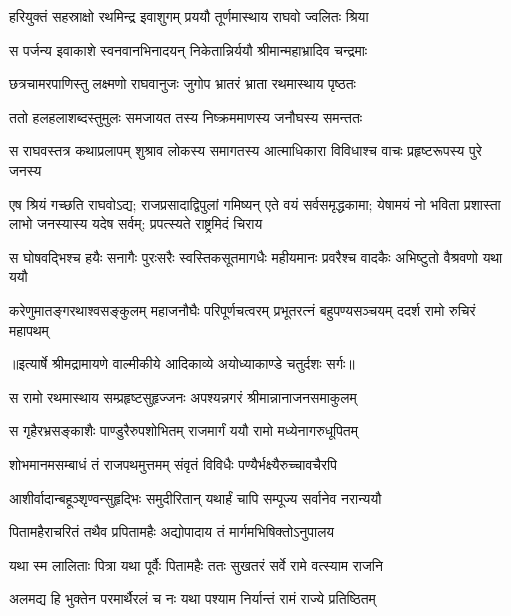 \twolineshloka
{हरियुक्तं सहस्राक्षो रथमिन्द्र इवाशुगम्}
{प्रययौ तूर्णमास्थाय राघवो ज्वलितः श्रिया} %

\twolineshloka
{स पर्जन्य इवाकाशे स्वनवानभिनादयन्}
{निकेतान्निर्ययौ श्रीमान्महाभ्रादिव चन्द्रमाः} %

\twolineshloka
{छत्रचामरपाणिस्तु लक्ष्मणो राघवानुजः}
{जुगोप भ्रातरं भ्राता रथमास्थाय पृष्ठतः} %

\twolineshloka
{ततो हलहलाशब्दस्तुमुलः समजायत}
{तस्य निष्क्रममाणस्य जनौघस्य समन्ततः} %

\fourlineindentedshloka
{स राघवस्तत्र कथाप्रलापम्}
{शुश्राव लोकस्य समागतस्य}
{आत्माधिकारा विविधाश्च वाचः}
{प्रहृष्टरूपस्य पुरे जनस्य} %

\threelineshloka
{एष श्रियं गच्छति राघवोऽद्य; राजप्रसादाद्विपुलां गमिष्यन्}
{एते वयं सर्वसमृद्धकामा; येषामयं नो भविता प्रशास्ता}
{लाभो जनस्यास्य यदेष सर्वम्; प्रपत्स्यते राष्ट्रमिदं चिराय} %

\fourlineindentedshloka
{स घोषवद्भिश्च हयैः सनागैः}
{पुरःसरैः स्वस्तिकसूतमागधैः}
{महीयमानः प्रवरैश्च वादकैः}
{अभिष्टुतो वैश्रवणो यथा ययौ} %

\fourlineindentedshloka
{करेणुमातङ्गरथाश्वसङ्कुलम्}
{महाजनौघैः परिपूर्णचत्वरम्}
{प्रभूतरत्नं बहुपण्यसञ्चयम्}
{ददर्श रामो रुचिरं महापथम्} %


{॥इत्यार्षे श्रीमद्रामायणे वाल्मीकीये आदिकाव्ये अयोध्याकाण्डे चतुर्दशः सर्गः॥}


\twolineshloka
{स रामो रथमास्थाय सम्प्रहृष्टसुहृज्जनः}
{अपश्यन्नगरं श्रीमान्नानाजनसमाकुलम्} %

\twolineshloka
{स गृहैरभ्रसङ्काशैः पाण्डुरैरुपशोभितम्}
{राजमार्गं ययौ रामो मध्येनागरुधूपितम्} %

\twolineshloka
{शोभमानमसम्बाधं तं राजपथमुत्तमम्}
{संवृतं विविधैः पण्यैर्भक्ष्यैरुच्चावचैरपि} %

\twolineshloka
{आशीर्वादान्बहूञ्शृण्वन्सुहृद्भिः समुदीरितान्}
{यथार्हं चापि सम्पूज्य सर्वानेव नरान्ययौ} %

\twolineshloka
{पितामहैराचरितं तथैव प्रपितामहैः}
{अद्योपादाय तं मार्गमभिषिक्तोऽनुपालय} %

\twolineshloka
{यथा स्म लालिताः पित्रा यथा पूर्वैः पितामहैः}
{ततः सुखतरं सर्वे रामे वत्स्याम राजनि} %

\twolineshloka
{अलमद्य हि भुक्तेन परमार्थैरलं च नः}
{यथा पश्याम निर्यान्तं रामं राज्ये प्रतिष्ठितम्} %

